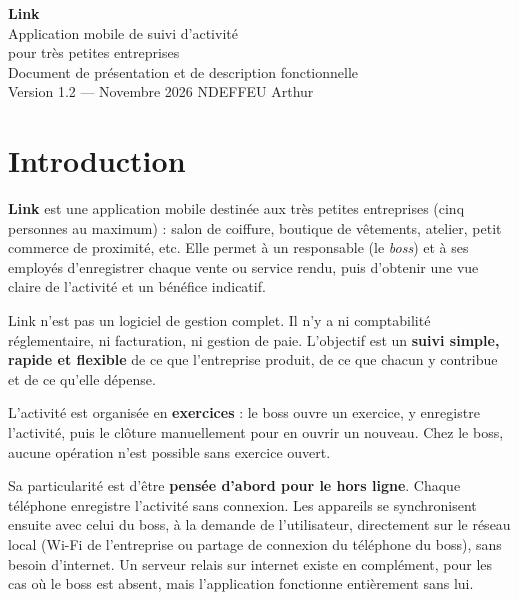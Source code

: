 \documentclass[11pt,a4paper]{article}
\begin{document}
	\begin{titlepage}
		\centering
		\vspace*{3cm}
		{\fontsize{48}{56}\selectfont\bfseries\color{linkblue} Link}\\[0.8cm]
		{\Large Application mobile de suivi d'activité\\pour très petites entreprises}\\[5cm]
		{\large Document de présentation et de description fonctionnelle}\\[0.5cm]
		{\color{linkgrey} Version 1.2 --- Novembre 2026}
		\vfill
		{\color{linkgrey}\small NDEFFEU Arthur}
	\end{titlepage}

	\tableofcontents
	\newpage

	\section{Introduction}
	\textbf{Link} est une application mobile destinée aux très petites entreprises (cinq personnes au maximum) : salon de coiffure, boutique de vêtements, atelier, petit commerce de proximité, etc. Elle permet à un responsable (le \emph{boss}) et à ses employés d'enregistrer chaque vente ou service rendu, puis d'obtenir une vue claire de l'activité et un bénéfice indicatif.

	Link n'est pas un logiciel de gestion complet. Il n'y a ni comptabilité réglementaire, ni facturation, ni gestion de paie. L'objectif est un \textbf{suivi simple, rapide et flexible} de ce que l'entreprise produit, de ce que chacun y contribue et de ce qu'elle dépense.

	L'activité est organisée en \textbf{exercices} : le boss ouvre un exercice, y enregistre l'activité, puis le clôture manuellement pour en ouvrir un nouveau. Chez le boss, aucune opération n'est possible sans exercice ouvert.

	Sa particularité est d'être \textbf{pensée d'abord pour le hors ligne}. Chaque téléphone enregistre l'activité sans connexion. Les appareils se synchronisent ensuite avec celui du boss, à la demande de l'utilisateur, directement sur le réseau local (Wi-Fi de l'entreprise ou partage de connexion du téléphone du boss), sans besoin d'internet. Un serveur relais sur internet existe en complément, pour les cas où le boss est absent, mais l'application fonctionne entièrement sans lui.
\end{document}
